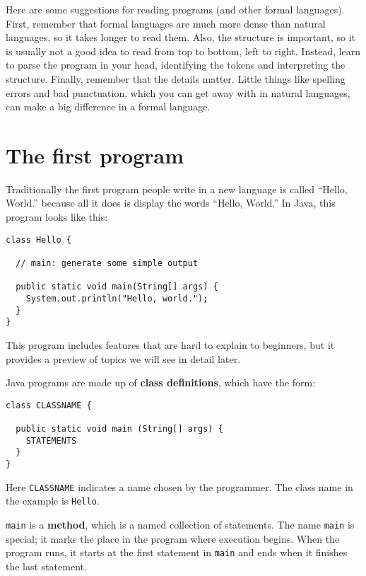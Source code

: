 \documentclass[12pt]{book}
\theoremstyle{definition}
\begin{document}
Here are some suggestions for reading programs (and other formal
languages).  First, remember that formal languages are much more dense
than natural languages, so it takes longer to read them.  Also, the
structure is important, so it is usually not a good idea to read
from top to bottom, left to right.  Instead, learn to parse the
program in your head, identifying the tokens and interpreting the
structure.  Finally, remember that the details matter.  Little things
like spelling errors and bad punctuation, which you can get away
with in natural languages, can make a big difference in a formal
language.

\section{The first program}
\label{hello}

Traditionally the first program people write in a new language
is called ``Hello, World.'' because all it does is display the
words ``Hello, World.''  In Java, this program looks like this:

\begin{lstlisting}
class Hello {

  // main: generate some simple output

  public static void main(String[] args) {
    System.out.println("Hello, world.");
  }
}
\end{lstlisting}
%
This program includes features that are hard to explain to
beginners, but it provides a preview of topics we
will see in detail later.

Java programs are made up of {\bf class definitions}, which have
the form:


\begin{lstlisting}
class CLASSNAME {

  public static void main (String[] args) {
    STATEMENTS
  }
}
\end{lstlisting}
%
Here {\tt CLASSNAME} indicates a name chosen by the programmer.
The class name in the example is {\tt Hello}.


{\tt main} is a {\bf method}, which is a named collection of
statements.  The name {\tt main} is special; it marks the place in the
program where execution begins.  When the program runs, it starts at
the first statement in {\tt main} and ends when it finishes the last
statement.
\end{document}
